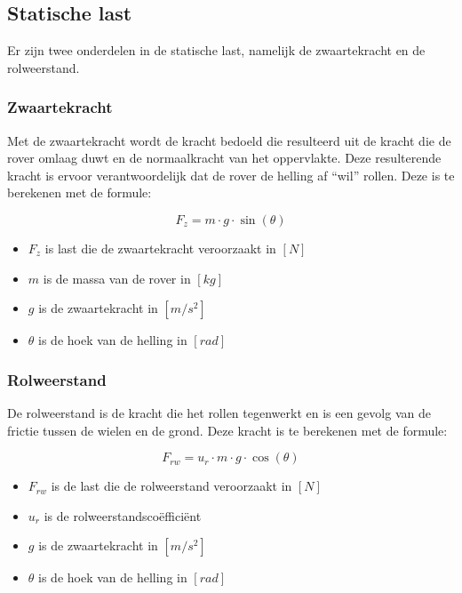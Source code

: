 \documentclass{article}
\begin{document}
        \subsection{Statische last}
            Er zijn twee onderdelen in de statische last, namelijk de zwaartekracht en de rolweerstand. 

            \subsubsection*{Zwaartekracht}
                Met de zwaartekracht wordt de kracht bedoeld die resulteerd uit de kracht die de rover omlaag duwt 
                en de normaalkracht van het oppervlakte. 
                Deze resulterende kracht is ervoor verantwoordelijk dat de rover de helling af ``wil'' rollen.
                Deze is te berekenen met de formule:
                
                \begin{equation}
                    F_{z} = m \cdot g \cdot \sin(\theta) 
                \end{equation}

                \begin{itemize}
                    \item $F_{z}$ is last die de zwaartekracht veroorzaakt in $[N]$
                    \item $m$ is de massa van de rover in $[kg]$
                    \item $g$ is de zwaartekracht in $[m/s^2]$
                    \item $\theta$ is de hoek van de helling in $[rad]$
                \end{itemize}
            
            \subsubsection*{Rolweerstand}
                De rolweerstand is de kracht die het rollen tegenwerkt en is een gevolg van de frictie tussen de wielen en de grond.
                Deze kracht is te berekenen met de formule:

                \begin{equation}
                    F_{rw} =  u_{r} \cdot m \cdot g \cdot \cos(\theta)
                \end{equation}

                \begin{itemize}
                    \item $F_{rw}$ is de last die de rolweerstand veroorzaakt in $[N]$
                    \item $u_{r}$ is de rolweerstandscoëfficiënt
                    \item $g$ is de zwaartekracht in $[m/s^2]$
                    \item $\theta$ is de hoek van de helling in $[rad]$
                \end{itemize}
\end{document}
